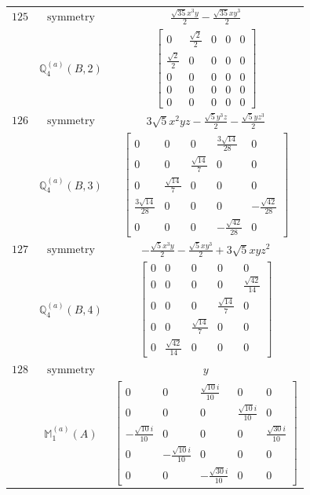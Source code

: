 \documentclass[fleqn,8pt,landscape]{jsarticle}
\begin{document}
\begin{longtable}{ccc}
$ 125 $ & $ \text{symmetry} $ & $ \frac{\sqrt{35} x^{3} y}{2} - \frac{\sqrt{35} x y^{3}}{2} $ \\
$  $ & $ \mathbb{Q}_{4}^{(a)}(B,2) $ & $ \begin{bmatrix} 0 & \frac{\sqrt{2}}{2} & 0 & 0 & 0 \\ \frac{\sqrt{2}}{2} & 0 & 0 & 0 & 0 \\ 0 & 0 & 0 & 0 & 0 \\ 0 & 0 & 0 & 0 & 0 \\ 0 & 0 & 0 & 0 & 0 \end{bmatrix} $ \\ \hline
$ 126 $ & $ \text{symmetry} $ & $ 3 \sqrt{5} x^{2} y z - \frac{\sqrt{5} y^{3} z}{2} - \frac{\sqrt{5} y z^{3}}{2} $ \\
$  $ & $ \mathbb{Q}_{4}^{(a)}(B,3) $ & $ \begin{bmatrix} 0 & 0 & 0 & \frac{3 \sqrt{14}}{28} & 0 \\ 0 & 0 & \frac{\sqrt{14}}{7} & 0 & 0 \\ 0 & \frac{\sqrt{14}}{7} & 0 & 0 & 0 \\ \frac{3 \sqrt{14}}{28} & 0 & 0 & 0 & - \frac{\sqrt{42}}{28} \\ 0 & 0 & 0 & - \frac{\sqrt{42}}{28} & 0 \end{bmatrix} $ \\ \hline
$ 127 $ & $ \text{symmetry} $ & $ - \frac{\sqrt{5} x^{3} y}{2} - \frac{\sqrt{5} x y^{3}}{2} + 3 \sqrt{5} x y z^{2} $ \\
$  $ & $ \mathbb{Q}_{4}^{(a)}(B,4) $ & $ \begin{bmatrix} 0 & 0 & 0 & 0 & 0 \\ 0 & 0 & 0 & 0 & \frac{\sqrt{42}}{14} \\ 0 & 0 & 0 & \frac{\sqrt{14}}{7} & 0 \\ 0 & 0 & \frac{\sqrt{14}}{7} & 0 & 0 \\ 0 & \frac{\sqrt{42}}{14} & 0 & 0 & 0 \end{bmatrix} $ \\ \hline
$ 128 $ & $ \text{symmetry} $ & $ y $ \\
$  $ & $ \mathbb{M}_{1}^{(a)}(A) $ & $ \begin{bmatrix} 0 & 0 & \frac{\sqrt{10} i}{10} & 0 & 0 \\ 0 & 0 & 0 & \frac{\sqrt{10} i}{10} & 0 \\ - \frac{\sqrt{10} i}{10} & 0 & 0 & 0 & \frac{\sqrt{30} i}{10} \\ 0 & - \frac{\sqrt{10} i}{10} & 0 & 0 & 0 \\ 0 & 0 & - \frac{\sqrt{30} i}{10} & 0 & 0 \end{bmatrix} $ \\ \hline

\end{longtable}
\end{document}
